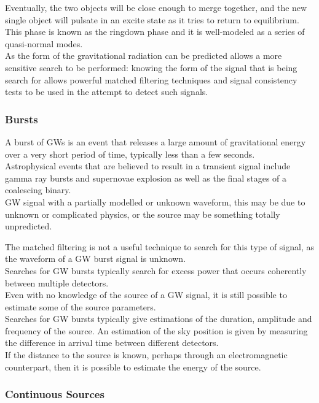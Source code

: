 \documentclass[binding=0.6cm, LaM]{sapthesis}
\begin{document}
	Eventually, the two objects will be close enough to merge together, 
	and the new single object will pulsate in an excite state as it tries to return to equilibrium. 
	This phase is known as the ringdown phase and it is well-modeled as a series of quasi-normal modes. \\ 
	As the form of the gravitational radiation can be predicted allows 
	a more sensitive search to be performed: knowing the form of the signal 
	that is being search for allows powerful matched filtering techniques 
	and signal consistency tests to be used in the attempt to detect such signals.


\subsubsection{Bursts}

	A burst of GWs is an event that releases a large amount 
	of gravitational energy over a very short period of time, typically less than a few seconds. \\ 
	Astrophysical events that are believed to result in a transient signal 
	include gamma ray bursts and supernovae explosion as well as the final stages of a coalescing binary. \\
	GW signal with a partially modelled or unknown waveform, 
	this may be due to unknown or complicated physics, or the source may be something totally unpredicted. 

	The matched filtering is not a useful technique to search for this type of signal, 
	as the waveform of a GW burst signal is unknown. \\
	Searches for GW bursts typically search for excess power that occurs coherently between multiple detectors. \\ 
	Even with no knowledge of the source of a GW signal, 
	it is still possible to estimate some of the source parameters. \\
	Searches for GW bursts typically give estimations of the duration, 
	amplitude and frequency of the source. 
	An estimation of the sky position is given by measuring the difference 
	in arrival time between different detectors. \\
	If the distance to the source is known, 
	perhaps through an electromagnetic counterpart, 
	then it is possible to estimate the energy of the source. 


\subsubsection{Continuous Sources}
\end{document}
